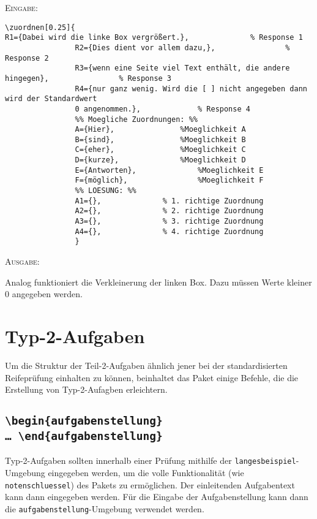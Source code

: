 \documentclass[a4paper,12pt]{article}
\begin{document}
\textsc{Eingabe:}
\begin{small}
\begin{verbatim}
\zuordnen[0.25]{
R1={Dabei wird die linke Box vergrößert.},				% Response 1
				R2={Dies dient vor allem dazu,},				% Response 2
				R3={wenn eine Seite viel Text enthält, die andere hingegen},				% Response 3
				R4={nur ganz wenig. Wird die [ ] nicht angegeben dann wird der Standardwert
				0 angenommen.},				% Response 4
				%% Moegliche Zuordnungen: %%
				A={Hier}, 				%Moeglichkeit A  
				B={sind}, 				%Moeglichkeit B  
				C={eher}, 				%Moeglichkeit C  
				D={kurze}, 				%Moeglichkeit D  
				E={Antworten}, 				%Moeglichkeit E  
				F={möglich}, 				%Moeglichkeit F  
				%% LOESUNG: %%
				A1={},				% 1. richtige Zuordnung
				A2={},				% 2. richtige Zuordnung
				A3={},				% 3. richtige Zuordnung
				A4={},				% 4. richtige Zuordnung
				}
\end{verbatim}



\textsc{Ausgabe:}

\end{small}

Analog funktioniert die Verkleinerung der linken Box. Dazu müssen Werte kleiner 0 angegeben werden.


\section{Typ-2-Aufgaben}
Um die Struktur der Teil-2-Aufgaben ähnlich jener bei der standardisierten Reifeprüfung einhalten zu können, beinhaltet das Paket einige Befehle, die die Erstellung von Typ-2-Aufagben erleichtern.

\subsection{\texttt{\textbackslash begin\{aufgabenstellung\} \ldots\ \textbackslash end\{aufgabenstellung\}}}
Typ-2-Aufgaben sollten innerhalb einer Prüfung mithilfe der \texttt{langesbeispiel}-Umgebung eingegeben werden, um die volle Funktionalität (wie \texttt{notenschluessel}) des Pakets zu ermöglichen. Der einleitenden Aufgabentext kann dann eingegeben werden. Für die Eingabe der Aufgabenstellung kann dann die \texttt{aufgabenstellung}-Umgebung verwendet werden.\leer
\end{document}
